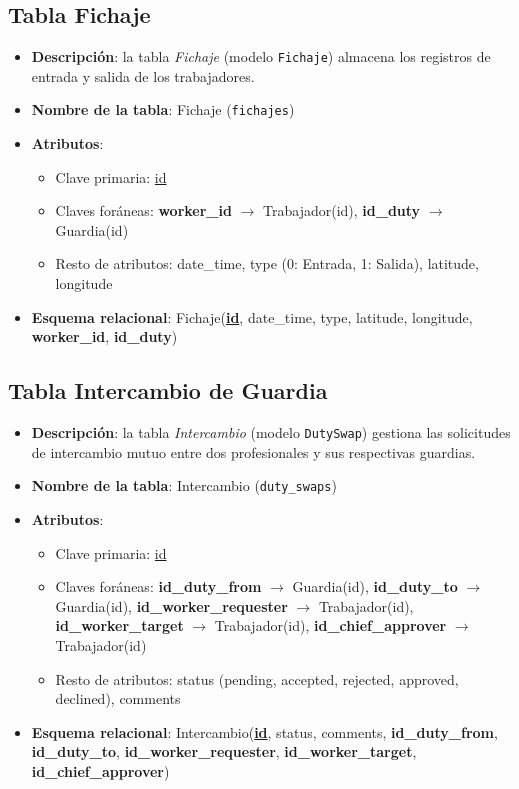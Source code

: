 \subsection{Tabla Fichaje}
\begin{itemize}
    \item \textbf{Descripción}: la tabla \textit{Fichaje} (modelo \texttt{Fichaje}) almacena los registros de entrada y salida de los trabajadores.
    \item \textbf{Nombre de la tabla}: Fichaje (\texttt{fichajes})
    \item \textbf{Atributos}:
    \begin{itemize}
        \item Clave primaria: \underline{id}
        \item Claves foráneas: \textbf{worker\_id} $\rightarrow$ Trabajador(id), \textbf{id\_duty} $\rightarrow$ Guardia(id)
        \item Resto de atributos: date\_time, type (0: Entrada, 1: Salida), latitude, longitude
    \end{itemize}
    \item \textbf{Esquema relacional}: Fichaje(\textbf{\underline{id}}, date\_time, type, latitude, longitude, \textbf{worker\_id}, \textbf{id\_duty})
\end{itemize}

\subsection{Tabla Intercambio de Guardia}
\begin{itemize}
    \item \textbf{Descripción}: la tabla \textit{Intercambio} (modelo \texttt{DutySwap}) gestiona las solicitudes de intercambio mutuo entre dos profesionales y sus respectivas guardias.
    \item \textbf{Nombre de la tabla}: Intercambio (\texttt{duty\_swaps})
    \item \textbf{Atributos}:
    \begin{itemize}
        \item Clave primaria: \underline{id}
        \item Claves foráneas: \textbf{id\_duty\_from} $\rightarrow$ Guardia(id), \textbf{id\_duty\_to} $\rightarrow$ Guardia(id), \textbf{id\_worker\_requester} $\rightarrow$ Trabajador(id), \textbf{id\_worker\_target} $\rightarrow$ Trabajador(id), \textbf{id\_chief\_approver} $\rightarrow$ Trabajador(id)
        \item Resto de atributos: status (pending, accepted, rejected, approved, declined), comments
    \end{itemize}
    \item \textbf{Esquema relacional}: Intercambio(\textbf{\underline{id}}, status, comments, \textbf{id\_duty\_from}, \textbf{id\_duty\_to}, \textbf{id\_worker\_requester}, \textbf{id\_worker\_target}, \textbf{id\_chief\_approver})
\end{itemize}

